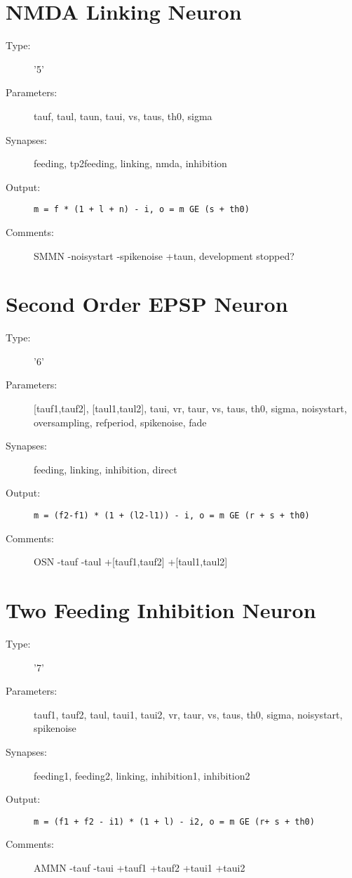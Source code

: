 \documentclass[12pt]{article}
\begin{document}
\section{NMDA Linking Neuron}
\begin{description}
\item[Type:] '5'

\item[Parameters:] tauf, taul, taun, taui, vs, taus, th0, sigma

\item[Synapses:] feeding, tp2feeding, linking, nmda, inhibition

\item[Output:] \texttt{m = f * (1 + l + n) - i, o = m GE (s + th0)}

\item[Comments:] SMMN -noisystart -spikenoise +taun, development stopped?
\end{description}



\section{Second Order EPSP Neuron}
\begin{description}
\item[Type:] '6'

\item[Parameters:] [tauf1,tauf2], [taul1,taul2], taui, vr, taur, vs, taus, th0, 
              sigma, noisystart, oversampling, refperiod, spikenoise, fade 

\item[Synapses:] feeding, linking, inhibition, direct

\item[Output:] \texttt{m = (f2-f1) * (1 + (l2-l1)) - i, o = m GE (r + s + th0)}

\item[Comments:] OSN -tauf -taul +[tauf1,tauf2] +[taul1,taul2]
\end{description}



\section{Two Feeding Inhibition Neuron}
\begin{description}
\item[Type:] '7'

\item[Parameters:] tauf1, tauf2, taul, taui1, taui2, vr, taur, vs, taus, th0, 
              sigma, noisystart, spikenoise

\item[Synapses:] feeding1, feeding2, linking, inhibition1, inhibition2

\item[Output:] \texttt{m = (f1 + f2 - i1) * (1 + l) - i2, o = m GE (r+ s + th0)}

\item[Comments:] AMMN -tauf -taui +tauf1 +tauf2 +taui1 +taui2
\end{description}
\end{document}
